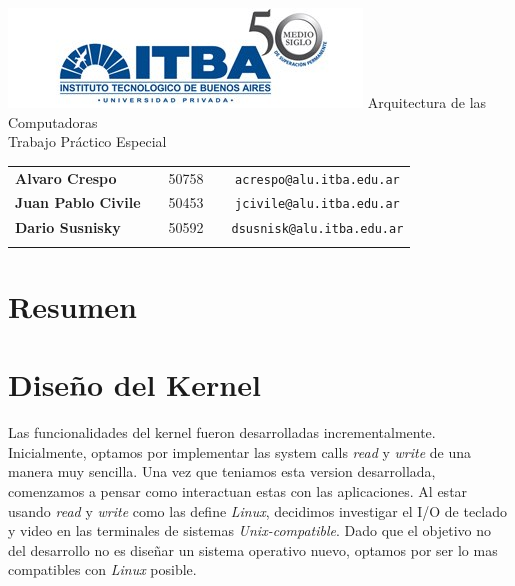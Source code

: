 \documentclass[a4paper,10pt]{article}
\begin{document}
\begin{titlepage}
        \thispagestyle{empty}
        \begin{center}
                \includegraphics{./images/itba.jpg}
                \vfill
                \Huge{Arquitectura de las Computadoras}\\
                \vspace{1cm}
                \huge{Trabajo Práctico Especial}\\
        \end{center}
        \vspace{2cm}
        \large{
                \begin{tabular}{lcrc}
                        \textbf{Alvaro Crespo} & & 50758 & \ \ \texttt{acrespo@alu.itba.edu.ar}\\
                        \textbf{Juan Pablo Civile} & & 50453 & \ \ \texttt{jcivile@alu.itba.edu.ar}\\
                        \textbf{Dario Susnisky} & & 50592 & \ \ \texttt{dsusnisk@alu.itba.edu.ar}\\
                        \\ 
                \end{tabular}
        }
        \vfill
\end{titlepage}

\setcounter{page}{1}

\tableofcontents
\newpage

\section{Resumen}

\section{Diseño del Kernel}
    Las funcionalidades del kernel fueron desarrolladas incrementalmente.
    Inicialmente, optamos por implementar las system calls \textit{read} y \textit{write} de una manera muy sencilla.
    Una vez que teniamos esta version desarrollada, comenzamos a pensar como interactuan estas con las aplicaciones.
    Al estar usando \textit{read} y \textit{write} como las define \textit{Linux}, decidimos investigar el I/O de teclado y video en las terminales de sistemas \textit{Unix-compatible}.
    Dado que el objetivo no del desarrollo no es diseñar un sistema operativo nuevo, optamos por ser lo mas compatibles con \textit{Linux} posible.
\end{document}
